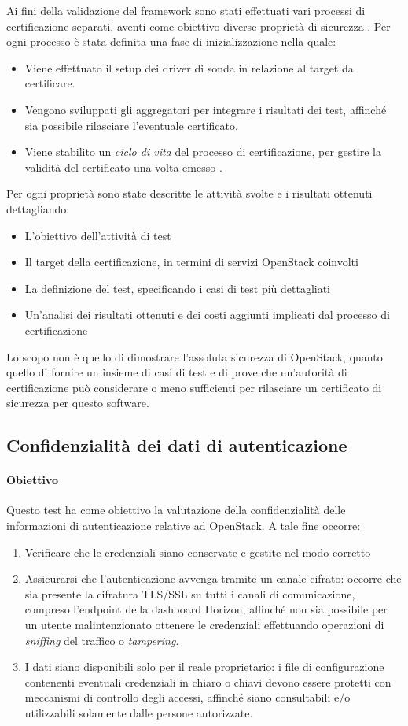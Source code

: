 \documentclass[../main.tex]{subfiles}
\begin{document}
Ai fini della validazione del framework sono stati effettuati vari processi di certificazione separati, aventi come obiettivo diverse proprietà di sicurezza \cite{CertOpenstack}.
Per ogni processo è stata definita una fase di inizializzazione nella quale:
\begin{itemize}
\item Viene effettuato il setup dei driver di sonda in relazione al target da certificare.
\item Vengono sviluppati gli aggregatori per integrare i risultati dei test, affinché sia possibile rilasciare l'eventuale certificato.
\item Viene stabilito un \textit{ciclo di vita} del processo di certificazione, per gestire la validità del certificato una volta emesso \cite{CertOpenstack}.
\end{itemize}
Per ogni proprietà sono state descritte le attività svolte e i risultati ottenuti dettagliando:
\begin{itemize}
\item L'obiettivo dell'attività di test
\item Il target della certificazione, in termini di servizi OpenStack coinvolti
\item La definizione del test, specificando i casi di test più dettagliati
\item Un'analisi dei risultati ottenuti e dei costi aggiunti implicati dal processo di certificazione
\end{itemize}
Lo scopo non è quello di dimostrare l'assoluta sicurezza di OpenStack, quanto quello di fornire un insieme di casi di test e di prove che un'autorità di certificazione può considerare o meno sufficienti per rilasciare un certificato di sicurezza per questo software.

\subsection{Confidenzialità dei dati di autenticazione}

\paragraph{Obiettivo}
Questo test ha come obiettivo la valutazione della confidenzialità delle informazioni di autenticazione relative ad OpenStack.
A tale fine occorre:
\begin{enumerate}
\item Verificare che le credenziali siano conservate e gestite nel modo corretto
\item Assicurarsi che l'autenticazione avvenga tramite un canale cifrato: occorre che sia presente la cifratura TLS/SSL su tutti i canali di comunicazione, compreso l'endpoint della dashboard Horizon, affinché non sia possibile per un utente malintenzionato ottenere le credenziali effettuando operazioni di \textit{sniffing} del traffico o \textit{tampering}.
\item I dati siano disponibili solo per il reale proprietario: i file di configurazione contenenti eventuali credenziali in chiaro o chiavi devono essere protetti con meccanismi di controllo degli accessi, affinché siano consultabili e/o utilizzabili solamente dalle persone autorizzate.
\end{enumerate}
\end{document}
